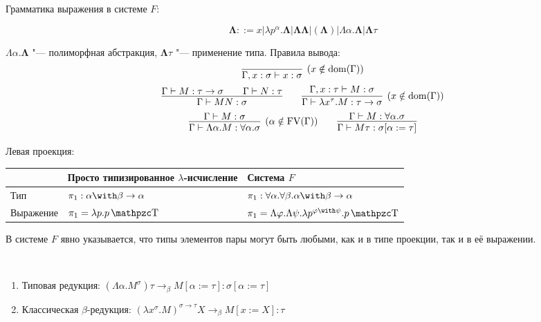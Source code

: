 \begin{definition}[система $F$]
Грамматика выражения в системе $F$:
    \begin{bnf}
    \[
        \mathbf\Lambda ::= x | \lambda p^\alpha . \mathbf\Lambda | \mathbf\Lambda \mathbf\Lambda | (\mathbf\Lambda)
        | \Lambda \alpha . \mathbf\Lambda | \mathbf\Lambda \tau
    \]
    \end{bnf}%
    $\Lambda \alpha . \mathbf\Lambda$ "--- полиморфная абстракция, $\mathbf\Lambda \tau$ "--- применение типа.
    Правила вывода:
    \inferspacing
    \begin{gather*}
        \infer[(x \notin \mathrm{dom}(\Gamma))]{\Gamma, x : \sigma \vdash x : \sigma}{} \\
        \infer{\Gamma \vdash MN : \sigma}{\Gamma \vdash M : \tau \rightarrow \sigma && \Gamma \vdash N : \tau} \qquad
        \infer[(x \notin \mathrm{dom}(\Gamma))]
                {\Gamma \vdash \lambda x^\tau . M : \tau \rightarrow \sigma}{\Gamma, x : \tau \vdash M : \sigma} \\
        \infer[(\alpha \notin \FV(\Gamma))]{\Gamma \vdash \Lambda \alpha . M : \forall \alpha . \sigma}{\Gamma \vdash M : \sigma} \qquad
        \infer{\Gamma \vdash M \tau : \sigma [\alpha := \tau]}{\Gamma \vdash M : \forall \alpha . \sigma}
    \end{gather*}
\end{definition}

\begin{example} Левая проекция:
    \begin{center}
    \begin{tabular}{l l l} \toprule
        & Просто типизированное $\lambda$-исчисление & Система $F$ \\ \midrule
        Тип & $\pi_1:\alpha\with\beta\rightarrow\alpha$ & $\pi_1:\forall \alpha . \forall \beta . \alpha \with \beta \rightarrow \alpha$ \\
        Выражение & $\pi_1 = \lambda p . p \comb T$ & $\pi_1 = \Lambda \varphi . \Lambda \psi . \lambda p^{\varphi\with\psi} . p \comb T$
        \\ \bottomrule
    \end{tabular}
    \end{center}
В системе $F$ явно указывается, что типы элементов пары могут быть любыми, как и в типе проекции, так и в её выражении.
\end{example}

\begin{definition} \ 
    \begin{enumerate}
        \item Типовая редукция: $\left(\Lambda \alpha . M^\sigma\right) \tau \rightarrow_\beta M[\alpha:=\tau] : \sigma[\alpha := \tau]$
        \item Классическая $\beta$-редукция: $\left(\lambda x^\sigma.M\right)^{\sigma\rightarrow\tau} X \rightarrow_\beta M [x:=X] : \tau$
    \end{enumerate}
\end{definition}

